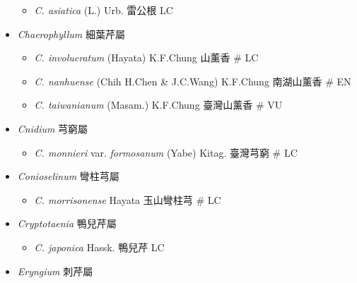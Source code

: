 \begin{itemize}
  \begin{itemize}
        \item[] \textit{C. asiatica} (L.) Urb.  雷公根   LC
  \end{itemize}
 \item[] \textit{Chaerophyllum} 細葉芹屬
                                
  \begin{itemize}
        \item[] \textit{C. involucratum} (Hayata) K.F.Chung  山薰香  \# LC
        \item[] \textit{C. nanhuense} (Chih H.Chen \& J.C.Wang) K.F.Chung  南湖山薰香  \# EN
        \item[] \textit{C. taiwanianum} (Masam.) K.F.Chung  臺灣山薰香  \# VU
  \end{itemize}
 \item[] \textit{Cnidium} 芎窮屬
                                
  \begin{itemize}
        \item[] \textit{C. monnieri} var. \textit{formosanum} (Yabe) Kitag.  臺灣芎窮  \# LC
  \end{itemize}
 \item[] \textit{Conioselinum} 彎柱芎屬
                                
  \begin{itemize}
        \item[] \textit{C. morrisonense} Hayata  玉山彎柱芎  \# LC
  \end{itemize}
 \item[] \textit{Cryptotaenia} 鴨兒芹屬
                                
  \begin{itemize}
        \item[] \textit{C. japonica} Hassk.  鴨兒芹   LC
  \end{itemize}
 \item[] \textit{Eryngium} 刺芹屬
                                

\end{itemize}
